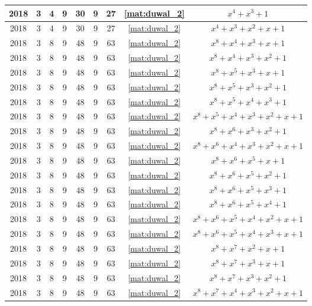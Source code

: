 \begin{longtable}{|c|c|c|c|c|c|c|c|c|}
2018 & 3 & 4 & 9 & 30 & 9 & 27 & \eqref{mat:duwal_2} & $x^4 + x^3 + 1$ \\ \hline 
2018 & 3 & 4 & 9 & 30 & 9 & 27 & \eqref{mat:duwal_2} & $x^4 + x^3 + x^2 + x + 1$ \\ \hline 
2018 & 3 & 8 & 9 & 48 & 9 & 63 & \eqref{mat:duwal_2} & $x^8 + x^4 + x^3 + x + 1$ \\ \hline 
2018 & 3 & 8 & 9 & 48 & 9 & 63 & \eqref{mat:duwal_2} & $x^8 + x^4 + x^3 + x^2 + 1$ \\ \hline 
2018 & 3 & 8 & 9 & 48 & 9 & 63 & \eqref{mat:duwal_2} & $x^8 + x^5 + x^3 + x + 1$ \\ \hline 
2018 & 3 & 8 & 9 & 48 & 9 & 63 & \eqref{mat:duwal_2} & $x^8 + x^5 + x^3 + x^2 + 1$ \\ \hline 
2018 & 3 & 8 & 9 & 48 & 9 & 63 & \eqref{mat:duwal_2} & $x^8 + x^5 + x^4 + x^3 + 1$ \\ \hline 
2018 & 3 & 8 & 9 & 48 & 9 & 63 & \eqref{mat:duwal_2} & $x^8 + x^5 + x^4 + x^3 + x^2 + x + 1$ \\ \hline 
2018 & 3 & 8 & 9 & 48 & 9 & 63 & \eqref{mat:duwal_2} & $x^8 + x^6 + x^3 + x^2 + 1$ \\ \hline 
2018 & 3 & 8 & 9 & 48 & 9 & 63 & \eqref{mat:duwal_2} & $x^8 + x^6 + x^4 + x^3 + x^2 + x + 1$ \\ \hline 
2018 & 3 & 8 & 9 & 48 & 9 & 63 & \eqref{mat:duwal_2} & $x^8 + x^6 + x^5 + x + 1$ \\ \hline 
2018 & 3 & 8 & 9 & 48 & 9 & 63 & \eqref{mat:duwal_2} & $x^8 + x^6 + x^5 + x^2 + 1$ \\ \hline 
2018 & 3 & 8 & 9 & 48 & 9 & 63 & \eqref{mat:duwal_2} & $x^8 + x^6 + x^5 + x^3 + 1$ \\ \hline 
2018 & 3 & 8 & 9 & 48 & 9 & 63 & \eqref{mat:duwal_2} & $x^8 + x^6 + x^5 + x^4 + 1$ \\ \hline 
2018 & 3 & 8 & 9 & 48 & 9 & 63 & \eqref{mat:duwal_2} & $x^8 + x^6 + x^5 + x^4 + x^2 + x + 1$ \\ \hline 
2018 & 3 & 8 & 9 & 48 & 9 & 63 & \eqref{mat:duwal_2} & $x^8 + x^6 + x^5 + x^4 + x^3 + x + 1$ \\ \hline 
2018 & 3 & 8 & 9 & 48 & 9 & 63 & \eqref{mat:duwal_2} & $x^8 + x^7 + x^2 + x + 1$ \\ \hline 
2018 & 3 & 8 & 9 & 48 & 9 & 63 & \eqref{mat:duwal_2} & $x^8 + x^7 + x^3 + x + 1$ \\ \hline 
2018 & 3 & 8 & 9 & 48 & 9 & 63 & \eqref{mat:duwal_2} & $x^8 + x^7 + x^3 + x^2 + 1$ \\ \hline 
2018 & 3 & 8 & 9 & 48 & 9 & 63 & \eqref{mat:duwal_2} & $x^8 + x^7 + x^4 + x^3 + x^2 + x + 1$ \\ \hline 

\end{longtable}
